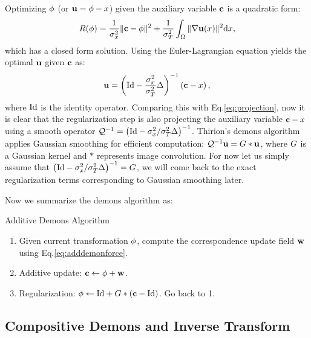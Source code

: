 \documentclass[letterpaper,12pt]{article}
\begin{document}
Optimizing $\phi$ (or $\mathbf{u} = \phi - x$) given the auxiliary variable $\mathbf{c}$ is a quadratic form: 
\begin{align}
R(\phi) = \frac{1}{\sigma_x^2} \|\mathbf{c} - \phi\|^2+\frac{1}{\sigma_T^2} \int_\Omega \| \nabla\mathbf{u}(x)\|^2 \text{d} x,
\end{align}
which has a closed form solution.  Using the Euler-Lagrangian equation yields the optimal $\mathbf{u}$ given $\mathbf{c}$ as:
\begin{align}
\mathbf{u} = \left( \text{Id} - \frac{\sigma_x^2}{\sigma_T^2} \Delta \right)^{-1} \left( \mathbf{c} - x \right),
\end{align}
where $\text{Id}$ is the identity operator. Comparing this with Eq.\ref{eq:projection}, now it is clear that the regularization step is also projecting the auxiliary variable $\mathbf{c}-x$ using a smooth operator 
$\mathcal{Q}^{-1} = \left( \text{Id} - {\sigma_x^2}/{\sigma_T^2} \Delta \right)^{-1}$. 
Thirion's demons algorithm applies Gaussian smoothing for efficient computation: $\mathcal{Q}^{-1} \mathbf{u} = {G} \ast \mathbf{u}$, where ${G}$ is a Gaussian kernel and $\ast$ represents image convolution. For now let us simply assume that $\left( \text{Id} - {\sigma_x^2}/{\sigma_T^2} \Delta \right)^{-1} = {G}$, we will come back to the exact regularization terms corresponding to Gaussian smoothing later.

Now we summarize the demons algorithm as:
\begin{algorithm}
\caption{Additive Demons Algorithm}
\label{alg:additivedemons}
\begin{enumerate}
\item{Given current transformation $\phi$, compute the correspondence update field $\mathbf{w}$ using Eq.\ref{eq:adddemonforce}. 
}
\item{Additive update: $\mathbf{c} \leftarrow \phi + \mathbf{w}$.
}
\item{Regularization: $\phi \leftarrow \text{Id} + {G} \ast (\mathbf{c} - \text{Id})$. Go back to 1.
}
\end{enumerate}
\end{algorithm}

\subsection{Compositive Demons and Inverse Transform}
\end{document}
